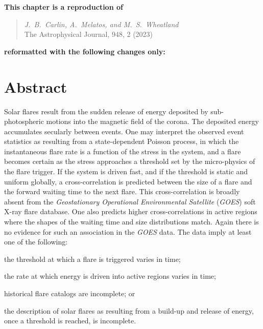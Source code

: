 
\textbf{This chapter is a reproduction of \citep{Carlin2023sf}} 
\begin{quote}
	\emph{J.~B.~Carlin, A.~Melatos, and M.~S.~Wheatland}\\
	The Astrophysical Journal, 948, 2 (2023)
\end{quote}
\textbf{reformatted with the following changes only:}


\section{Abstract}
Solar flares result from the sudden release of energy deposited by sub-photospheric motions into the magnetic field of the corona. The deposited energy accumulates secularly between events. One may interpret the observed event statistics as resulting from a state-dependent Poisson process, in which the instantaneous flare rate is a function of the stress in the system, and a flare becomes certain as the stress approaches a threshold set by the micro-physics of the flare trigger. If the system is driven fast, and if the threshold is static and uniform globally, a cross-correlation is predicted between the size of a flare and the forward waiting time to the next flare. This cross-correlation is broadly absent from the \emph{Geostationary Operational Environmental Satellite} (\emph{GOES}) soft X-ray flare database. One also predicts higher cross-correlations in active regions where the shapes of the waiting time and size distributions match. Again there is no evidence for such an association in the \emph{GOES} data. The data imply at least one of the following: \begin{enumerate*} \item the threshold at which a flare is triggered varies in time; \item the rate at which energy is driven into active regions varies in time; \item historical flare catalogs are incomplete; or \item the description of solar flares as resulting from a build-up and release of energy, once a threshold is reached, is incomplete. \end{enumerate*}

